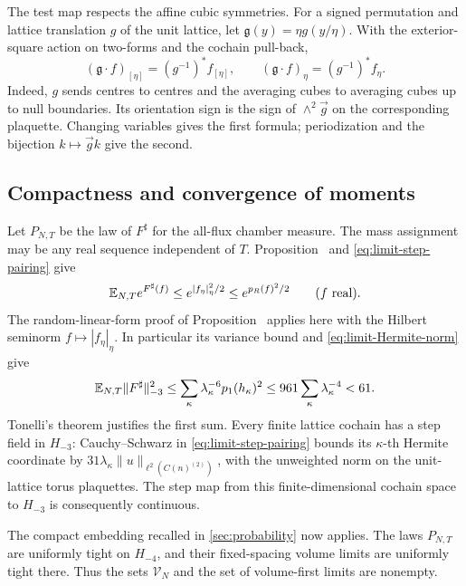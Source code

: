 The test map respects the affine cubic symmetries. For a signed
permutation and lattice translation $g$ of the unit lattice, let
$\mathfrak g(y)=\eta g(y/\eta)$. With the exterior-square action
on two-forms and the cochain pull-back,
\begin{equation}\label{eq:limit-test-equivariance}
 (\mathfrak g\cdot f)_{[\eta]}=(g^{-1})^*f_{[\eta]},
 \qquad
 (\mathfrak g\cdot f)_\eta=(g^{-1})^*f_\eta.
\end{equation}
Indeed, $g$ sends centres to centres and the averaging cubes to
averaging cubes up to null boundaries. Its orientation sign is
the sign of $\wedge^2\vec g$ on the corresponding plaquette.
Changing variables gives the first formula; periodization and
the bijection $k\mapsto\vec gk$ give the second.

\subsection{Compactness and convergence of moments}

Let $P_{N,T}$ be the law of $F^\sharp$ for the all-flux chamber
measure. The mass assignment may be any real sequence independent of
$T$. Proposition~ and
\eqref{eq:limit-step-pairing} give
\begin{equation}\label{eq:limit-cutoff-G}
 \mathbb E_{N,T}e^{F^\sharp(f)}
       \le e^{|f_\eta|_\eta^2/2}\le e^{p_R(f)^2/2}
       \qquad(f\text{ real}).
\end{equation}
The random-linear-form proof of Proposition~
applies here with the Hilbert seminorm $f\mapsto|f_\eta|_\eta$.
In particular its variance bound and \eqref{eq:limit-Hermite-norm}
give
\begin{equation}\label{eq:limit-uniform-tightness}
 \mathbb E_{N,T}\|F^\sharp\|_{-3}^2
 \le\sum_\kappa\lambda_\kappa^{-6}p_1(h_\kappa)^2
 \le961\sum_\kappa\lambda_\kappa^{-4}<61.
\end{equation}
Tonelli's theorem justifies the first sum. Every finite lattice
cochain has a step field in $H_{-3}$: Cauchy--Schwarz in
\eqref{eq:limit-step-pairing} bounds its $\kappa$-th Hermite
coordinate by $31\lambda_\kappa\|u\|_{\ell^2(C(n)^{(2)})}$,
with the unweighted norm on the unit-lattice torus plaquettes.
The step map from this finite-dimensional cochain space to $H_{-3}$
is consequently continuous.

The compact embedding recalled in \cref{sec:probability}
now applies. The laws $P_{N,T}$ are uniformly tight on $H_{-4}$,
and their fixed-spacing volume limits are uniformly tight there.
Thus the sets $\mathcal V_N$ and the set of volume-first limits
are nonempty.

